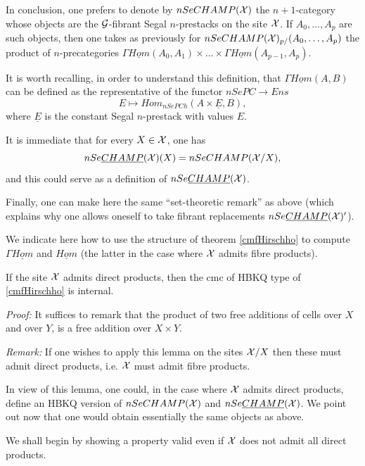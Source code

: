 In conclusion, one prefers to denote by
$nSeCHAMP({\cal X} )$
the $n+1$-category whose objects
are the ${\cal G}$-fibrant Segal $n$-prestacks on the site
${\cal X}$. If $A_0,\ldots , A_p$ are
such objects, then one takes as previously for
$nSeCHAMP({\cal X} )_{p/}(A_0,\ldots , A_p)$
the product of $n$-precategories
$\Gamma \underline{Hom}(A_0,A_1)\times \ldots \times
\Gamma \underline{Hom}(A_{p-1}, A_p).$

It is worth recalling, in order to understand this definition, that
$\Gamma \underline{Hom}(A,B)$ can be defined as the representative of the
functor
$nSePC\rightarrow Ens$
$$
E\mapsto Hom _{nSePCh}(A\times \underline{E},B),
$$
where $\underline{E}$ is the constant Segal $n$-prestack with values $E$.


It is immediate that for every $X\in {\cal X}$, one has
$$
nSe\underline{CHAMP}({\cal X} )(X) = nSeCHAMP({\cal X} /X),
$$
and this could serve as a definition of $nSe\underline{CHAMP}({\cal X} )$.

Finally, one can make here the same ``set-theoretic remark''
as above (which explains
why one allows oneself to take fibrant replacements
$nSe\underline{CHAMP}({\cal X} )'$).


We indicate here how to use the structure of theorem
\ref{cmfHirschho} to compute $\Gamma \underline{Hom}$ and
$\underline{Hom}$ (the latter in the case where ${\cal X}$ admits fibre
products).

\begin{lemma}
\label{hbkqinterne}
If the site ${\cal X}$ admits direct products, then the cmc of HBKQ type of
\ref{cmfHirschho} is internal.
\end{lemma}
{\em Proof:} It suffices to remark
that the product of two free additions of cells over $X$
and over $Y$, is a free addition over $X\times Y$.
\eop

{\em Remark:} If one wishes to apply this lemma on the sites ${\cal X} /X$ then
these must admit direct products, i.e. ${\cal X}$ must admit fibre products.

In view of this lemma, one could, in the case where ${\cal X}$ admits direct
products, define an HBKQ version of $nSeCHAMP({\cal X} )$ and
$nSe\underline{CHAMP}({\cal X} )$. We point out now that one would obtain
essentially the same objects as above.

We shall begin by showing a property valid even if ${\cal X}$ does not admit
all direct products.


